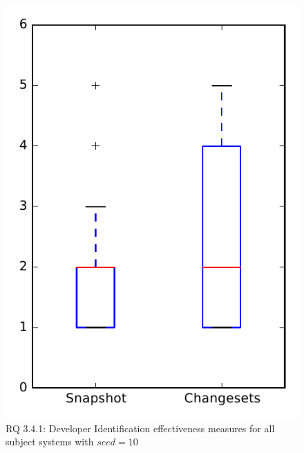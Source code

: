 
\begin{figure}
\centering
\includegraphics[height=0.4\textheight]{figures/dit_seed/rq1_overview_10}
\caption{RQ 3.4.1: Developer Identification effectiveness measures for all subject systems with $seed=10$}
\label{fig:dit_seed:rq1:overview}
\end{figure}
